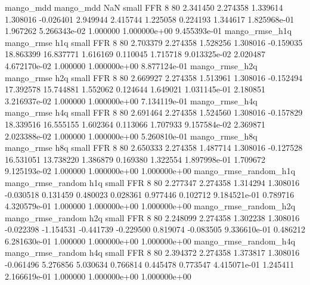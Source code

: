             mango_mdd         mango_mdd                  NaN      small      FFR                 8 80 2.341450       2.274358 1.339614       1.308016   -0.026401      2.949944      2.415744     1.225058       0.224193  1.344617 1.825968e-01     1.967262   5.266343e-02            1.000000    1.000000e+00        9.455393e-01
       mango_rmse_h1q        mango_rmse                  h1q      small      FFR                 8 80 2.703379       2.274358 1.528256       1.308016   -0.159035     18.863399     16.837771     1.616169       0.110045  1.715718 9.013325e-02     2.020487   4.672170e-02            1.000000    1.000000e+00        8.877124e-01
       mango_rmse_h2q        mango_rmse                  h2q      small      FFR                 8 80 2.669927       2.274358 1.513961       1.308016   -0.152494     17.392578     15.744881     1.552062       0.124644  1.649021 1.031145e-01     2.180851   3.216937e-02            1.000000    1.000000e+00        7.134119e-01
       mango_rmse_h4q        mango_rmse                  h4q      small      FFR                 8 80 2.691464       2.274358 1.524560       1.308016   -0.157829     18.339516     16.555155     1.602364       0.113066  1.707933 9.157584e-02     2.369871   2.023388e-02            1.000000    1.000000e+00        5.260810e-01
       mango_rmse_h8q        mango_rmse                  h8q      small      FFR                 8 80 2.650333       2.274358 1.487714       1.308016   -0.127528     16.531051     13.738220     1.386879       0.169380  1.322554 1.897998e-01     1.709672   9.125193e-02            1.000000    1.000000e+00        1.000000e+00
mango_rmse_random_h1q mango_rmse_random                  h1q      small      FFR                 8 80 2.277347       2.274358 1.314294       1.308016   -0.030518      0.131459      0.480023     0.028361       0.977446  0.102712 9.184521e-01     0.789716   4.320579e-01            1.000000    1.000000e+00        1.000000e+00
mango_rmse_random_h2q mango_rmse_random                  h2q      small      FFR                 8 80 2.248099       2.274358 1.302238       1.308016   -0.022398     -1.154531     -0.441739    -0.229500       0.819074 -0.083505 9.336610e-01     0.486212   6.281630e-01            1.000000    1.000000e+00        1.000000e+00
mango_rmse_random_h4q mango_rmse_random                  h4q      small      FFR                 8 80 2.394372       2.274358 1.373817       1.308016   -0.061496      5.276856      5.030634     0.766814       0.445478  0.773547 4.415071e-01     1.245411   2.166619e-01            1.000000    1.000000e+00        1.000000e+00

